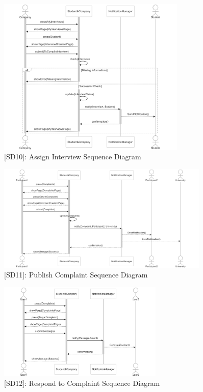 \begin{figure}
    \centering
    \includegraphics[width=0.8\textwidth]{Latex/Images/AssignInterviewSequenceDiagram.png}
    \caption{[SD10]: Assign Interview Sequence Diagram}
    \label{fig:SD10}
\end{figure}
\clearpage

\begin{figure}
    \centering
    \includegraphics[width=0.9\textwidth]{Latex/Images/PublishComplaintSequenceDiagram.png}
    \caption{[SD11]: Publish Complaint Sequence Diagram}
    \label{fig:SD11}
\end{figure}

\begin{figure}
    \centering
    \includegraphics[width=0.7\textwidth]{Latex/Images/RespondToComplaintSequenceDiagram.png}
    \caption{[SD12]: Respond to Complaint Sequence Diagram}
    \label{fig:SD12}
\end{figure}

